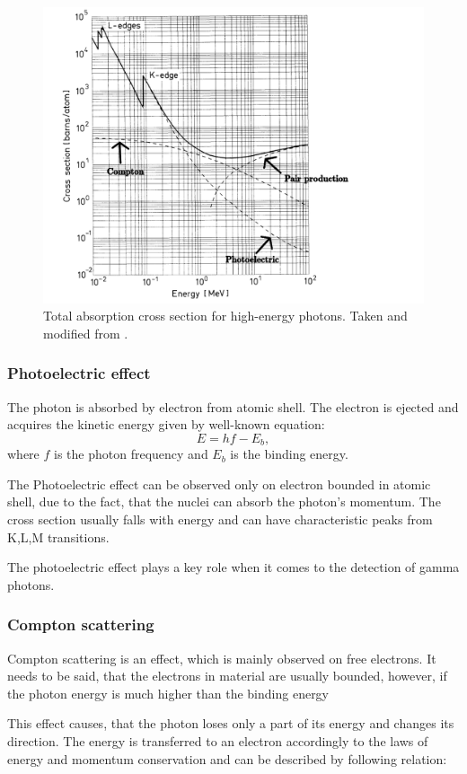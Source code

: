 \begin{figure}[H]
 \centering
 \includegraphics[scale=0.6, angle = 0]{./pictures/totalCross}
 \caption{Total absorption cross section for high-energy photons. Taken and modified from \cite{Leo1987-wy}.}
 \label{cross}
 
\end{figure}
 


\subsubsection{Photoelectric effect}
The photon is absorbed by electron from atomic shell. The electron is ejected and acquires the kinetic energy given by well-known equation:
 \begin{equation}
 E = hf - E_{b},
 \end{equation}
where $f$ is the photon frequency and $E_{b}$ is the binding energy.
 
The Photoelectric effect can be observed only on electron bounded in atomic shell, due to the fact, that the nuclei can absorb the photon's momentum. The cross section usually falls with energy and can have characteristic peaks from K,L,M transitions.

\par

The photoelectric effect plays a key role when it comes to the detection of gamma photons.

\subsubsection{Compton scattering}
Compton scattering is an effect, which is mainly observed on free electrons. It needs to be said, that the electrons in material are usually bounded, however, if the photon energy is much higher than the binding energy 
\par
This effect causes, that the photon loses only a part of its energy and changes its direction. The energy is transferred to an electron accordingly to the laws of energy and momentum conservation and can be described by following relation:

